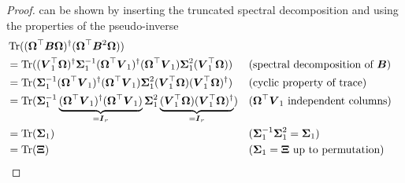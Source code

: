 \begin{proof}
     can be shown by inserting the truncated
    spectral decomposition 
    and using the properties of the pseudo-inverse
    \begin{align*}
        &\operatorname{Tr}((\boldsymbol{\Omega}^{\top} \boldsymbol{B} \boldsymbol{\Omega})^{\dagger}(\boldsymbol{\Omega}^{\top} \boldsymbol{B}^2 \boldsymbol{\Omega})) \notag \\
            &= \operatorname{Tr}((\boldsymbol{V}_1^{\top} \boldsymbol{\Omega})^{\dagger} \boldsymbol{\Sigma}_1^{-1} (\boldsymbol{\Omega}^{\top} \boldsymbol{V}_1)^{\dagger} (\boldsymbol{\Omega}^{\top} \boldsymbol{V}_1) \boldsymbol{\Sigma}_1^2 (\boldsymbol{V}_1^{\top} \boldsymbol{\Omega})) &&\text{(spectral decomposition of $\boldsymbol{B}$)} \notag \\
            &= \operatorname{Tr}(\boldsymbol{\Sigma}_1^{-1} (\boldsymbol{\Omega}^{\top} \boldsymbol{V}_1)^{\dagger} (\boldsymbol{\Omega}^{\top} \boldsymbol{V}_1)\boldsymbol{\Sigma}_1^2 (\boldsymbol{V}_1^{\top} \boldsymbol{\Omega}) (\boldsymbol{V}_1^{\top} \boldsymbol{\Omega})^{\dagger}) &&\text{(cyclic property of trace)} \notag \\
            &= \operatorname{Tr}(\boldsymbol{\Sigma}_1^{-1} \underbrace{(\boldsymbol{\Omega}^{\top} \boldsymbol{V}_1)^{\dagger} (\boldsymbol{\Omega}^{\top} \boldsymbol{V}_1)}_{=\boldsymbol{I}_r} \boldsymbol{\Sigma}_1^2 \underbrace{(\boldsymbol{V}_1^{\top} \boldsymbol{\Omega}) (\boldsymbol{V}_1^{\top} \boldsymbol{\Omega})^{\dagger}}_{=\boldsymbol{I}_r}) &&\text{($\boldsymbol{\Omega}^{\top} \boldsymbol{V}_1$ independent columns)} \notag \\
            &= \operatorname{Tr}(\boldsymbol{\Sigma}_1) &&\text{($\boldsymbol{\Sigma}_1^{-1} \boldsymbol{\Sigma}_1^{2} = \boldsymbol{\Sigma}_1$)}  \notag \\
            &= \operatorname{Tr}(\boldsymbol{\Xi}) &&\text{($\boldsymbol{\Sigma}_1 = \boldsymbol{\Xi}$ up to permutation)}
    \end{align*}
\end{proof}

